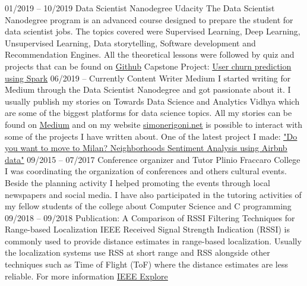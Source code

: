 \documentclass[9pt]{developercv} %
\begin{document}
\begin{entrylist}
	\entry
		{01/2019 -- 10/2019}
		{Data Scientist Nanodegree}
		{Udacity}
		{The Data Scientist Nanodegree program is an advanced course designed to prepare the student for data scientist jobs. The topics covered were Supervised Learning, Deep Learning, Unsupervised Learning, Data storytelling, Software development and Recommendation Engines. All the theoretical lessons were followed by quiz and projects that can be found on \underline{\href{https://github.com/simonerigoni/udacity/tree/master/data_scientist_nanodegree}{Github}}}
		{}
		{Capstone Project: \underline{\href{https://towardsdatascience.com/user-churn-prediction-using-spark-22ff8dafb5c}{User churn prediction using Spark}}}
	\entry
		{06/2019 -- Currently}
		{Content Writer}
		{Medium}
		{I started writing for Medium through the Data Scientist Nanodegree and got passionate about it. I usually publish my stories on Towards Data Science and Analytics Vidhya which are some of the biggest platforms for data science topics. All my stories can be found on \underline{\href{https://medium.com/@simone.rigoni01}{Medium}} and on my website \underline{\href{http://www.simonerigoni.net}{simonerigoni.net}} is possible to interact with some of the projects I have written about. One of the latest project I made: \underline{\href{https://towardsdatascience.com/do-you-want-to-move-to-milan-neighborhoods-sentiment-analysis-using-airbnb-data-72db72ebc070}{"Do you want to move to Milan? Neighborhoods Sentiment Analysis using Airbnb data"}}}
		{}
		{}
	\entry
		{09/2015 -- 07/2017}
		{Conference organizer and Tutor}
		{Plinio Fraccaro College}
		{I was coordinating the organization of conferences and others cultural events. Beside the planning activity I helped promoting the events through local newspapers and social media.
		I have also participated in the tutoring activities of my fellow students of the college about Computer Science and C programming
		}
		{}
		{}
	\entry
		{09/2018 -- 09/2018}
		{Publication: A Comparison of RSSI Filtering Techniques for Range-based Localization}
		{IEEE}
		{Received Signal Strength Indication (RSSI) is commonly used to provide distance estimates in range-based localization. Usually the localization systems use RSS at short range and RSS alongside other techniques such as Time of Flight (ToF) where the distance estimates are less reliable. For more information \underline{\href{https://ieeexplore.ieee.org/abstract/document/8502556}{IEEE Explore}}}

\end{entrylist}
\end{document}
